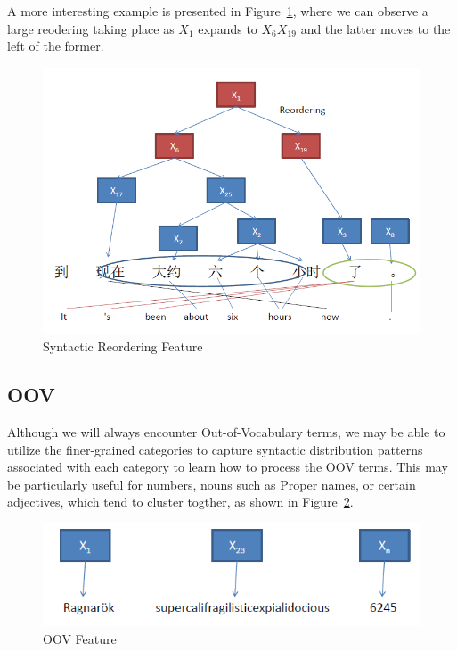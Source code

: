 A more interesting example is presented in Figure~\ref{fig:synt_feat2}, where we can observe a large reodering taking place as $X_1$ expands to $X_6X_19$ and the latter moves to the left of the former.

\begin{figure}[h]
	\centering
		\includegraphics[scale=0.5]{training_img_files/synt_feat2.PNG}
	\caption{Syntactic Reordering Feature}
	\label{fig:synt_feat2}
\end{figure}


\subsection{OOV}
Although we will always encounter Out-of-Vocabulary terms, we may be able to utilize the finer-grained categories to capture syntactic distribution patterns associated with each category to learn how to process the OOV terms. This may be particularly useful for numbers, nouns such as Proper names, or certain adjectives, which tend to cluster togther, as shown in Figure~\ref{fig:oov_feat}.

\begin{figure}[h]
	\centering
		\includegraphics[scale=0.5]{training_img_files/oov_feat.PNG}
	\caption{OOV Feature}
	\label{fig:oov_feat}
\end{figure}

